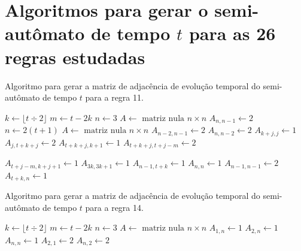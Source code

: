 \documentclass[12pt,a4paper]{article}
\begin{document}
\newpage

\def\refname{Referências bibliográficas}



\appendix
\section{Algoritmos para gerar o semi-autômato de tempo $t$ para as 26 regras
estudadas}

\begin{algorithm}[H]
\caption{Algoritmo para gerar a matriz de adjacência de evolução temporal do
semi-autômato de tempo $t$ para a regra 11.}
\label{alg:r11}
\begin{algorithmic}
\STATE $k \leftarrow \lfloor t \div 2 \rfloor$
\STATE $m \leftarrow t-2k$
    \STATE $n \leftarrow 3$
    \STATE $A \leftarrow \mbox{ matriz nula } n \times n$
    \STATE $A_{n,n-1} \leftarrow 2$
\ELSE
    \STATE $n \leftarrow 2(t+1)$
    \STATE $A \leftarrow \mbox{ matriz nula } n \times n$
    \STATE $A_{n-2,n-1} \leftarrow 2$
    \STATE $A_{n,n-2} \leftarrow 2$
        \STATE $A_{k+j,j} \leftarrow 1$
        \STATE $A_{j,t+k+j} \leftarrow 2$
    \ENDFOR
        \STATE $A_{t+k+j,k+1} \leftarrow 1$
    \ENDFOR
            \STATE $A_{t+k+j,t+j-m} \leftarrow 2$
        \ENDFOR
    \ENDIF
{}
\end{algorithmic}
\end{algorithm}

\begin{algorithm}[H]
\begin{algorithmic}
            \STATE $A_{t+j-m,k+j+1} \leftarrow 1$
        \ENDFOR
    \ENDIF
        \STATE $A_{3k,3k+1} \leftarrow 1$
    \ENDIF
\ENDIF
\STATE $A_{n-1,t+k} \leftarrow 1$
\STATE $A_{n,n} \leftarrow 1$
\STATE $A_{n-1,n-1} \leftarrow 2$
\STATE $A_{t+k,n} \leftarrow 1$
\end{algorithmic}
\end{algorithm}

\begin{algorithm}[H]
\caption{Algoritmo para gerar a matriz de adjacência de evolução temporal do
semi-autômato de tempo $t$ para a regra 14.}
\label{alg:r14}
\begin{algorithmic}
\STATE $k \leftarrow \lfloor t \div 2 \rfloor$
\STATE $m \leftarrow t-2k$
    \STATE $n \leftarrow 3$
    \STATE $A \leftarrow \mbox{ matriz nula } n \times n$
    \STATE $A_{1,n} \leftarrow 1$
    \STATE $A_{2,n} \leftarrow 1$
    \STATE $A_{n,n} \leftarrow 1$
    \STATE $A_{2,1} \leftarrow 2$
    \STATE $A_{n,2} \leftarrow 2$
\ELSE
{}
\end{algorithmic}
\end{algorithm}
\end{document}
